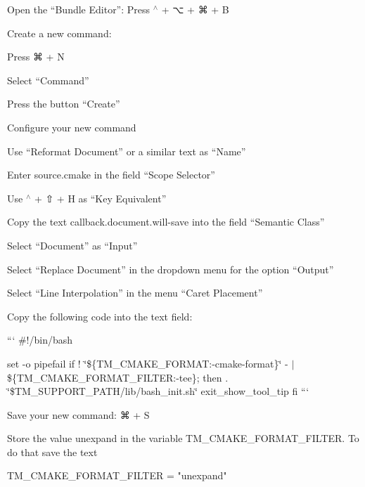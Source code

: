\begin{DoxyEnumerate}
\item Open the “\+Bundle Editor”\+: Press {\ttfamily $^\wedge$} + {\ttfamily ⌥} + {\ttfamily ⌘} + {\ttfamily B}
\item Create a new command\+:
\begin{DoxyEnumerate}
\item Press {\ttfamily ⌘} + {\ttfamily N}
\item Select “\+Command”
\item Press the button “\+Create”
\end{DoxyEnumerate}
\item Configure your new command
\begin{DoxyEnumerate}
\item Use “\+Reformat Document” or a similar text as “\+Name”
\item Enter {\ttfamily source.\+cmake} in the field “\+Scope Selector”
\item Use {\ttfamily $^\wedge$} + {\ttfamily ⇧} + {\ttfamily H} as “\+Key Equivalent”
\item Copy the text {\ttfamily callback.\+document.\+will-\/save} into the field “\+Semantic Class”
\item Select “\+Document” as “\+Input”
\item Select “\+Replace Document” in the dropdown menu for the option “\+Output”
\item Select “\+Line Interpolation” in the menu “\+Caret Placement”
\item Copy the following code into the text field\+:

``` \#!/bin/bash

set -\/o pipefail if ! \char`\"{}\$\{\+T\+M\+\_\+\+C\+M\+A\+K\+E\+\_\+\+F\+O\+R\+M\+A\+T\+:-\/cmake-\/format\}\char`\"{} -\/ $\vert$ \$\{T\+M\+\_\+\+C\+M\+A\+K\+E\+\_\+\+F\+O\+R\+M\+A\+T\+\_\+\+F\+I\+L\+T\+ER\+:-\/tee\}; then . \char`\"{}\$\+T\+M\+\_\+\+S\+U\+P\+P\+O\+R\+T\+\_\+\+P\+A\+T\+H/lib/bash\+\_\+init.\+sh\char`\"{} exit\+\_\+show\+\_\+tool\+\_\+tip fi ```
\item Save your new command\+: {\ttfamily ⌘} + {\ttfamily S}
\item Store the value {\ttfamily unexpand} in the variable {\ttfamily T\+M\+\_\+\+C\+M\+A\+K\+E\+\_\+\+F\+O\+R\+M\+A\+T\+\_\+\+F\+I\+L\+T\+ER}. To do that save the text
\end{DoxyEnumerate}
\end{DoxyEnumerate}


\begin{DoxyCode}
TM\_CMAKE\_FORMAT\_FILTER = "unexpand"
\end{DoxyCode}


